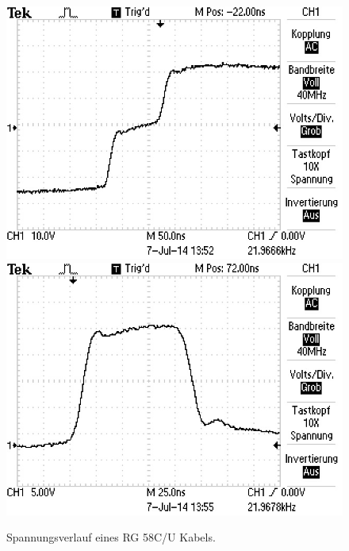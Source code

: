 \begin{figure}
\centering
	\includegraphics[width = 12cm]{data/c/ALL0000/F0000TEK.jpg}
	\includegraphics[width = 12cm]{data/c/ALL0001/F0001TEK.jpg}
	\caption{Spannungsverlauf eines RG 58C/U Kabels.}
	\label{fig_zeit1}
\end{figure}
